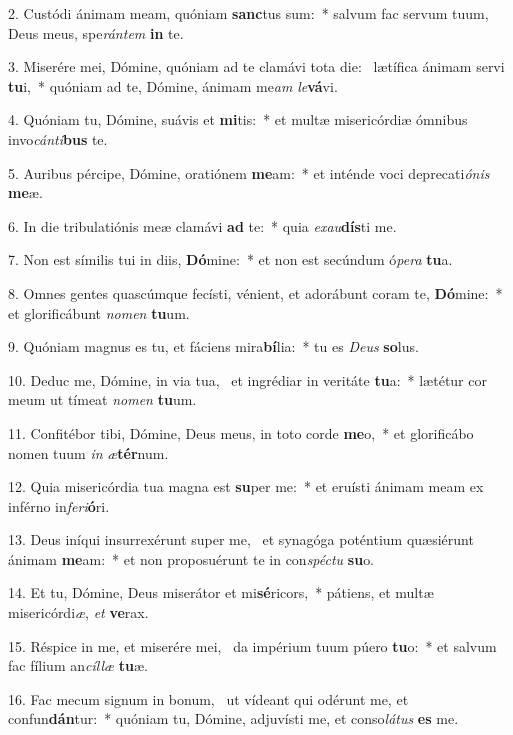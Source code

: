 2. Custódi ánimam meam, quóniam \textbf{sanc}tus sum:~*  salvum fac servum tuum, Deus meus, spe\textit{rán}\textit{tem} \textbf{in} te.\

3. Miserére mei, Dómine, quóniam ad te clamávi tota die: \dag\  lætífica ánimam servi \textbf{tu}i,~*  quóniam ad te, Dómine, ánimam me\textit{am} \textit{le}\textbf{vá}vi.\

4. Quóniam tu, Dómine, suávis et \textbf{mi}tis:~*  et multæ misericórdiæ ómnibus invo\textit{cán}\textit{ti}\textbf{bus} te.\

5. Auribus pércipe, Dómine, oratiónem \textbf{me}am:~*  et inténde voci deprecati\textit{ó}\textit{nis} \textbf{me}æ.\

6. In die tribulatiónis meæ clamávi \textbf{ad} te:~*  quia \textit{ex}\textit{au}\textbf{dís}ti me.\

7. Non est símilis tui in diis, \textbf{Dó}mine:~*  et non est secúndum ó\textit{pe}\textit{ra} \textbf{tu}a.\

8. Omnes gentes quascúmque fecísti, vénient, et adorábunt coram te, \textbf{Dó}mine:~*  et glorificábunt \textit{no}\textit{men} \textbf{tu}um.\

9. Quóniam magnus es tu, et fáciens mira\textbf{bí}lia:~*  tu es \textit{De}\textit{us} \textbf{so}lus.\

10. Deduc me, Dómine, in via tua, \dag\  et ingrédiar in veritáte \textbf{tu}a:~*  lætétur cor meum ut tímeat \textit{no}\textit{men} \textbf{tu}um.\

11. Confitébor tibi, Dómine, Deus meus, in toto corde \textbf{me}o,~*  et glorificábo nomen tuum \textit{in} \textit{æ}\textbf{tér}num.\

12. Quia misericórdia tua magna est \textbf{su}per me:~*  et eruísti ánimam meam ex inférno in\textit{fe}\textit{ri}\textbf{ó}ri.\

13. Deus iníqui insurrexérunt super me, \dag\  et synagóga poténtium quæsiérunt ánimam \textbf{me}am:~*  et non proposuérunt te in con\textit{spéc}\textit{tu} \textbf{su}o.\

14. Et tu, Dómine, Deus miserátor et mi\textbf{sé}ricors,~*  pátiens, et multæ misericórdi\textit{æ}, \textit{et} \textbf{ve}rax.\

15. Réspice in me, et miserére mei, \dag\  da impérium tuum púero \textbf{tu}o:~*  et salvum fac fílium an\textit{cíl}\textit{læ} \textbf{tu}æ.\

16. Fac mecum signum in bonum, \dag\  ut vídeant qui odérunt me, et confun\textbf{dán}tur:~*  quóniam tu, Dómine, adjuvísti me, et conso\textit{lá}\textit{tus} \textbf{es} me.\

